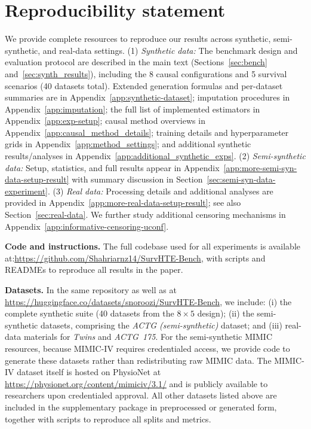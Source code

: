 \documentclass{article} %
\begin{document}
\section*{Reproducibility statement}
\vspace{-.5em}
We provide complete resources to reproduce our results across synthetic, semi-synthetic, and real-data settings. 
(1) \textit{Synthetic data:} The benchmark design and evaluation protocol are described in the main text (Sections~\ref{sec:bench} and~\ref{sec:synth_results}), including the 8 causal configurations and 5 survival scenarios (40 datasets total). Extended generation formulas and per-dataset summaries are in Appendix~\ref{app:synthetic-dataset}; imputation procedures in Appendix~\ref{app:imputation}; the full list of implemented estimators in Appendix~\ref{app:exp-setup}; causal method overviews in Appendix~\ref{app:causal_method_details}; training details and hyperparameter grids in Appendix~\ref{app:method_settings}; and additional synthetic results/analyses in Appendix~\ref{app:additional_synthetic_exps}. 
(2) \textit{Semi-synthetic data:} Setup, statistics, and full results appear in Appendix~\ref{app:more-semi-syn-data-setup-result} with summary discussion in Section~\ref{sec:semi-syn-data-experiment}. (3) \textit{Real data:} Processing details and additional analyses are provided in Appendix~\ref{app:more-real-data-setup-result}; see also Section~\ref{sec:real-data}. We further study additional censoring mechanisms in Appendix~\ref{app:informative-censoring-uconf}.

\textbf{Code and instructions.} The full codebase used for all experiments is available at:\url{https://github.com/Shahriarnz14/SurvHTE-Bench}, with scripts and READMEs to reproduce all results in the paper.

\textbf{Datasets.} In the same repository as well as at \url{https://huggingface.co/datasets/snoroozi/SurvHTE-Bench}, we include: (i) the complete synthetic suite (40 datasets from the $8\times5$ design); (ii) the semi-synthetic datasets, comprising the \emph{ACTG (semi-synthetic)} dataset; and (iii) real-data materials for \emph{Twins} and \emph{ACTG~175}. For the semi-synthetic MIMIC resources, because MIMIC-IV requires credentialed access, we provide code to generate these datasets rather than redistributing raw MIMIC data. The MIMIC-IV dataset itself is hosted on PhysioNet at \href{https://physionet.org/content/mimiciv/3.1/}{https://physionet.org/content/mimiciv/3.1/} and is publicly available to researchers upon credentialed approval. All other datasets listed above are included in the supplementary package in preprocessed or generated form, together with scripts to reproduce all splits and metrics.
\end{document}
